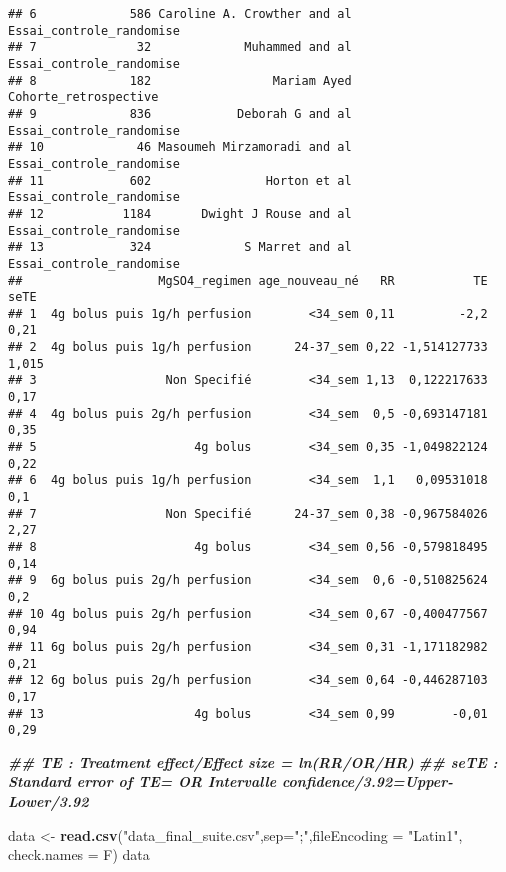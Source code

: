\documentclass[
]{article}
\newenvironment{Shaded}{\begin{snugshade}}{\end{snugshade}}
\newcommand{\AttributeTok}[1]{\textcolor[rgb]{0.13,0.29,0.53}{#1}}
\newcommand{\DocumentationTok}[1]{\textcolor[rgb]{0.56,0.35,0.01}{\textbf{\textit{#1}}}}
\newcommand{\FunctionTok}[1]{\textcolor[rgb]{0.13,0.29,0.53}{\textbf{#1}}}
\newcommand{\NormalTok}[1]{#1}
\newcommand{\OtherTok}[1]{\textcolor[rgb]{0.56,0.35,0.01}{#1}}
\newcommand{\StringTok}[1]{\textcolor[rgb]{0.31,0.60,0.02}{#1}}
\begin{document}
\begin{verbatim}
## 6             586 Caroline A. Crowther and al Essai_controle_randomise
## 7              32             Muhammed and al Essai_controle_randomise
## 8             182                 Mariam Ayed    Cohorte_retrospective
## 9             836            Deborah G and al Essai_controle_randomise
## 10             46 Masoumeh Mirzamoradi and al Essai_controle_randomise
## 11            602                Horton et al Essai_controle_randomise
## 12           1184       Dwight J Rouse and al Essai_controle_randomise
## 13            324             S Marret and al Essai_controle_randomise
##                   MgSO4_regimen age_nouveau_né   RR           TE  seTE
## 1  4g bolus puis 1g/h perfusion        <34_sem 0,11         -2,2  0,21
## 2  4g bolus puis 1g/h perfusion      24-37_sem 0,22 -1,514127733 1,015
## 3                  Non Specifié        <34_sem 1,13  0,122217633  0,17
## 4  4g bolus puis 2g/h perfusion        <34_sem  0,5 -0,693147181  0,35
## 5                      4g bolus        <34_sem 0,35 -1,049822124  0,22
## 6  4g bolus puis 1g/h perfusion        <34_sem  1,1   0,09531018   0,1
## 7                  Non Specifié      24-37_sem 0,38 -0,967584026  2,27
## 8                      4g bolus        <34_sem 0,56 -0,579818495  0,14
## 9  6g bolus puis 2g/h perfusion        <34_sem  0,6 -0,510825624   0,2
## 10 4g bolus puis 2g/h perfusion        <34_sem 0,67 -0,400477567  0,94
## 11 6g bolus puis 2g/h perfusion        <34_sem 0,31 -1,171182982  0,21
## 12 6g bolus puis 2g/h perfusion        <34_sem 0,64 -0,446287103  0,17
## 13                     4g bolus        <34_sem 0,99        -0,01  0,29
\end{verbatim}

\begin{Shaded}
\begin{Highlighting}[]
\DocumentationTok{\#\#   TE : Treatment effect/Effect size = ln(RR/OR/HR)}
\DocumentationTok{\#\#   seTE : Standard error of TE= OR Intervalle confidence/3.92=Upper{-}Lower/3.92}
\end{Highlighting}
\end{Shaded}

\begin{Shaded}
\begin{Highlighting}[]
\NormalTok{data }\OtherTok{\textless{}{-}} \FunctionTok{read.csv}\NormalTok{(}\StringTok{"data\_final\_suite.csv"}\NormalTok{,}\AttributeTok{sep=}\StringTok{";"}\NormalTok{,}\AttributeTok{fileEncoding =} \StringTok{"Latin1"}\NormalTok{, }\AttributeTok{check.names =}\NormalTok{ F)}
\NormalTok{data}
\end{Highlighting}
\end{Shaded}
\end{document}
